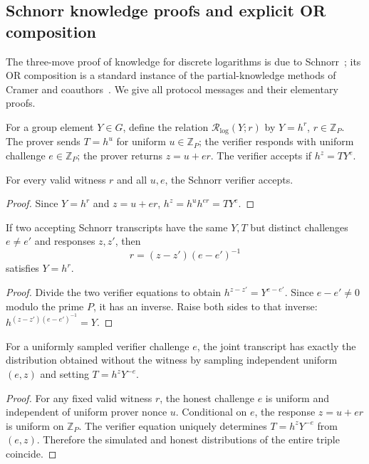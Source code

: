 \subsection{Schnorr knowledge proofs and explicit OR composition}\label{sec:realize:or}
The three-move proof of knowledge for discrete logarithms
is due to Schnorr~\cite{Schnorr1991}; its OR composition is
a standard instance of the partial-knowledge methods
of Cramer and coauthors~\cite{CramerDamgardSchoenmakers1994}.
We give all protocol messages and their elementary proofs.

\begin{definition}\label{def:realize:schnorr}
For a group element $Y\in G$, define the relation
$\mathcal R_{\log}(Y;r)$ by $Y=h^r$,
$r\in\mathbb Z_P$.
The prover sends $T=h^u$ for uniform
$u\in\mathbb Z_P$; the verifier responds with
uniform challenge $e\in\mathbb Z_P$; the
prover returns $z=u+er$.
The verifier accepts if
$h^z=TY^e$.
\end{definition}

\begin{lemma}\label{lem:realize:schnorr-complete}
For every valid witness $r$ and all $u,e$,
the Schnorr verifier accepts.
\end{lemma}
\begin{proof}
Since $Y=h^r$ and $z=u+er$,
$h^z=h^uh^{er}=TY^e$.
\end{proof}

\begin{lemma}\label{lem:realize:schnorr-extract}
If two accepting Schnorr transcripts have the same
$Y,T$ but distinct challenges $e\ne e'$ and
responses $z,z'$, then
\[
 \boxed{r=(z-z')(e-e')^{-1}}
\]
satisfies $Y=h^r$.
\end{lemma}
\begin{proof}
Divide the two verifier equations to obtain
$h^{z-z'}=Y^{e-e'}$.
Since $e-e'\ne0$ modulo the prime $P$, it has
an inverse. Raise both sides to that inverse:
$h^{(z-z')(e-e')^{-1}}=Y$.
\end{proof}

\begin{lemma}\label{lem:realize:schnorr-hvzk}
For a uniformly sampled verifier challenge $e$,
the joint transcript has exactly the distribution obtained
without the witness by sampling independent uniform
$(e,z)$ and setting $T=h^zY^{-e}$.
\end{lemma}
\begin{proof}
For any fixed valid witness $r$,
the honest challenge $e$ is uniform and independent of
uniform prover nonce $u$. Conditional on $e$,
the response $z=u+er$ is uniform on $\mathbb Z_P$.
The verifier equation uniquely determines
$T=h^zY^{-e}$ from $(e,z)$.
Therefore the simulated and honest distributions
of the entire triple coincide.
\end{proof}

